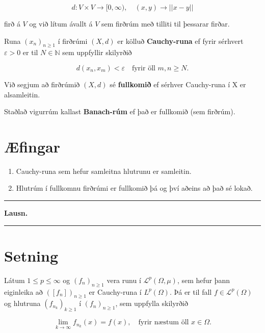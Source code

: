 \documentclass[]{book}
\begin{document}
\[
d: V\times V \rightarrow [0,\infty), \quad (x,y)\rightarrow||x-y||
\]

firð á \(V\) og við lítum ávallt á \(V\) sem firðrúm með tilliti til þessarar firðar.

Runa \((x_n)_{n\geq1}\) í firðrúmi \((X,d)\) er kölluð \textbf{Cauchy-runa} ef fyrir sérhvert \(\varepsilon > 0\) er til \(N\in\mathbb N\) sem uppfyllir skilyrðið

\[
d(x_n,x_m)<\varepsilon\quad \text{fyrir öll } m,n\geq N.
\]

Við segjum að firðrúmið \((X,d)\) sé \textbf{fullkomið} ef sérhver Cauchy-runa í X er alsamleitin.

Staðlað vigurrúm kallast \textbf{Banach-rúm} ef það er fullkomið (sem firðrúm).

\hypertarget{fingar}{%
\section*{Æfingar}\label{fingar}}

\begin{enumerate}
\def\labelenumi{\arabic{enumi}.}
\item
  Cauchy-runa sem hefur samleitna hlutrunu er samleitin.
\item
  Hlutrúm í fullkomnu firðrúmi er fullkomið þá og því aðeins að það sé lokað.
\end{enumerate}

\begin{center}\rule{0.5\linewidth}{\linethickness}\end{center}

\textbf{Lausn.}

\begin{center}\rule{0.5\linewidth}{\linethickness}\end{center}

\hypertarget{setning-70}{%
\section*{Setning}\label{setning-70}}

Látum \(1 \leq p \leq \infty\) og \((f_n)_{n\geq1}\) vera runu í \(\mathcal L^p(\Omega,\mu)\), sem hefur þann eiginleika að \(([f_n])_{n\geq1}\) er Cauchy-runa í \(L^p(\Omega)\). Þá er til fall \(f\in\mathcal L^p(\Omega)\) og hlutruna \((f_{n_k})_{k\geq1}\) í \((f_n)_{n\geq1}\), sem uppfylla skilyrðið

\[
\lim_{k\rightarrow\infty}f_{n_k}(x) = f(x), \quad \text{fyrir næstum öll } x\in\Omega.
\]
\end{document}
